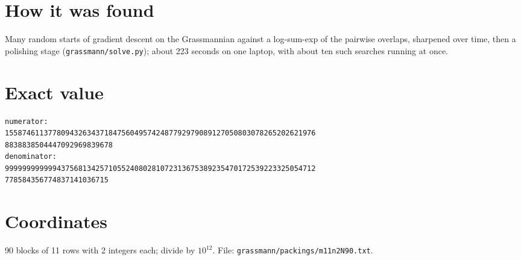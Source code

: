 \documentclass[11pt,a4paper]{article}
\begin{document}
\section{How it was found}
Many random starts of gradient descent on the Grassmannian against a log-sum-exp of the pairwise overlaps, sharpened over time, then a polishing stage (\texttt{grassmann/solve.py}); about 223 seconds on one laptop, with about ten such searches running at once.


\appendix
\section{Exact value}
{\small
\begin{verbatim}
numerator:
155874611377809432634371847560495742487792979089127050803078265202621976
8838838504447092969839678
denominator:
999999999999437568134257105524080281072313675389235470172539223325054712
778584356774837141036715
\end{verbatim}}

\section{Coordinates}
90 blocks of 11 rows with 2 integers each; divide by $10^{12}$. File: \texttt{grassmann/packings/m11n2N90.txt}.
{\tiny
\begin{multicols}{4}
\end{multicols}}
\end{document}
